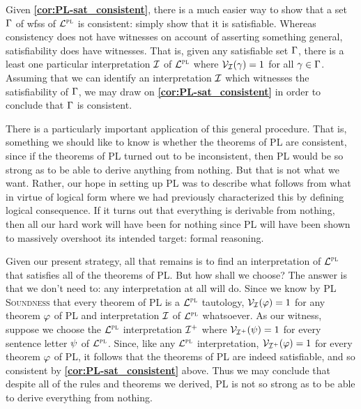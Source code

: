 Given \textbf{\ref{cor:PL-sat_consistent}}, there is a much easier way to show that a set $\Gamma$ of wfss of $\mathcal{L}^{\textsc{pl}}$ is consistent: simply show that it is satisfiable. 
Whereas consistency does not have witnesses on account of asserting something general, satisfiability does have witnesses.
That is, given any satisfiable set $\Gamma$, there is a least one particular interpretation $\mathcal{I}$ of $\mathcal{L}^{\textsc{pl}}$ where $\mathcal{V}_{\mathcal{I}}(\gamma) = 1$ for all $\gamma \in \Gamma$. 
Assuming that we can identify an interpretation $\mathcal{I}$ which witnesses the satisfiability of $\Gamma$, we may draw on \textbf{\ref{cor:PL-sat_consistent}} in order to conclude that $\Gamma$ is consistent. 

There is a particularly important application of this general procedure.
That is, something we should like to know is whether the theorems of PL are consistent, since if the theorems of PL turned out to be inconsistent, then PL would be so strong as to be able to derive anything from nothing.
But that is not what we want.
Rather, our hope in setting up PL was to describe what follows from what in virtue of logical form where we had previously characterized this by defining logical consequence.
If it turns out that everything is derivable from nothing, then all our hard work will have been for nothing since PL will have been shown to massively overshoot its intended target: formal reasoning.

Given our present strategy, all that remains is to find an interpretation of $\mathcal{L}^{\textsc{pl}}$ that satisfies all of the theorems of PL. 
But how shall we choose?
The answer is that we don't need to: any interpretation at all will do.
Since we know by \textsc{PL Soundness} that every theorem of PL is a $\mathcal{L}^{\textsc{pl}}$ tautology, $\mathcal{V}_{\mathcal{I}}(\varphi) = 1$ for any theorem $\varphi$ of PL and interpretation $\mathcal{I}$ of $\mathcal{L}^{\textsc{pl}}$ whatsoever. 
As our witness, suppose we choose the $\mathcal{L}^{\textsc{pl}}$ interpretation $\mathcal{I}^+$ where $\mathcal{V}_{\mathcal{I}^+}(\psi) = 1$ for every sentence letter $\psi$ of $\mathcal{L}^{\textsc{pl}}$. 
Since, like any $\mathcal{L}^{\textsc{pl}}$ interpretation, $\mathcal{V}_{\mathcal{I}^+}(\varphi) = 1$ for every theorem $\varphi$ of PL, it follows that the theorems of PL are indeed satisfiable, and so consistent by \textbf{\ref{cor:PL-sat_consistent}} above.
Thus we may conclude that despite all of the rules and theorems we derived, PL is not so strong as to be able to derive everything from nothing.


